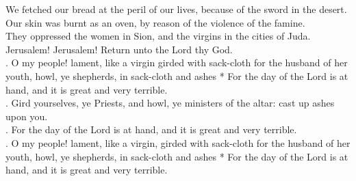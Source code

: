 \begin{Parallel}[v]{\colw}{\colx}
{{We fetched our bread at the peril of our lives, because of the sword in the desert.\\
Our skin was burnt as an oven, by reason of the violence of the famine.\\
They oppressed the women in Sion, and the virgins in the cities of Juda.\\
Jerusalem! Jerusalem! Return unto the Lord thy God.\\
\Rbar. O my people! lament, like a virgin girded with sack-cloth for the husband of her youth, howl, ye shepherds, in sack-cloth and ashes * For the day of the Lord is at hand, and it is great and very terrible.\\
\Vbar. Gird yourselves, ye Priests, and howl, ye ministers of the altar: cast up ashes upon you.\\
\Rbar. For the day of the Lord is at hand, and it is great and very terrible.\\
\Rbar. O my people! lament, like a virgin, girded with sack-cloth for the husband of her youth, howl, ye shepherds, in sack-cloth and ashes * For the day of the Lord is at hand, and it is great and very terrible.}}

\end{Parallel}